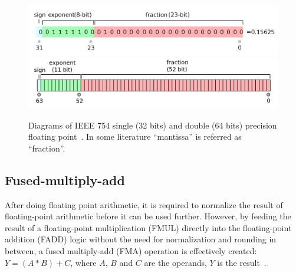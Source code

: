 \documentclass[logo,bsc,singlespacing,parskip]{infthesis}
\begin{document}
\begin{figure}
    \begin{center}
        \captionsetup{justification=centering}
        \includegraphics[width=\linewidth]{image/ieee-f32.png}
        \includegraphics[width=\linewidth]{image/ieee-f64.png}
        \caption{Diagrams of IEEE 754 single (32 bits) and double (64 bits)
        precision floating point~\cite{ieee754-diagram}. In some literature
        ``mantissa'' is referred as ``fraction''.}
        \label{fig:ieee-f32}
    \end{center}
\end{figure}

\subsection{Fused-multiply-add}
\label{sec:FMA}

After doing floating point arithmetic, it is required to normalize the result of
floating-point arithmetic before it can be used further. However, by feeding the
result of a floating-point multiplication (FMUL) directly into the
floating-point addition (FADD) logic without the need for normalization and
rounding in between, a fused multiply-add (FMA) operation is effectively
created: 
\begin{math}Y = (A * B) + C \end{math}, where 
\begin{math}A\end{math},
\begin{math}B\end{math} and
\begin{math}C\end{math} are the operands, 
 \begin{math}Y\end{math} is the result~\cite{CARD}.
\end{document}
